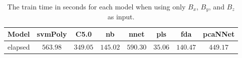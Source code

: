 \begin{table}[!ht]
	\centering
	\begin{tabular}{|c|c|c|c|c|c|c|c|}
		\hline
		Model & svmPoly & C5.0 & nb & nnet & pls & fda & pcaNNet \\ \hline
		elapsed & $563.98$ & $349.05$ & $145.02$ & $590.30$ & $35.06$ & $140.47$ & $449.17$ \\ \hline
	\end{tabular}
	\caption{The train time in seconds for each model when using only $B_{x}$, $B_{y}$, and $B_{z}$ as input.}
	\label{tab:time:reverse:coord:train}
\end{table}
